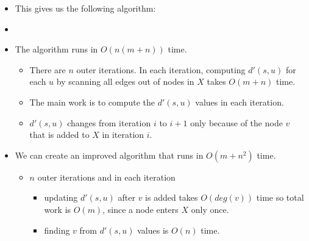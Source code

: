 \begin{itemize}
\begin{itemize}
    \end{itemize}
    \item This gives us the following algorithm:
    \item[] 
    \item The algorithm runs in $O(n(m + n))$ time.
    \begin{itemize}
        \item There are $n$ outer iterations. In each iteration, computing $d'(s, u)$ for each $u$ by scanning all edges out of nodes in $X$ takes $O(m + n)$ time.
        \item The main work is to compute the $d'(s, u)$ values in each iteration.
        \item $d'(s, u)$ changes from iteration $i$ to $i + 1$ only because of the node $v$ that is added to $X$ in iteration $i$.
    \end{itemize}
    \item We can create an improved algorithm that runs in $O(m + n^2)$ time.
    \begin{itemize}
        \item $n$ outer iterations and in each iteration
        \begin{itemize}
            \item updating $d'(s, u)$ after $v$ is added takes $O(deg(v))$ time so total work is $O(m)$, since a node enters $X$ only once.
            \item finding $v$ from $d'(s, u)$ values is $O(n)$ time.
        \end{itemize}
    \end{itemize}
\end{itemize}

